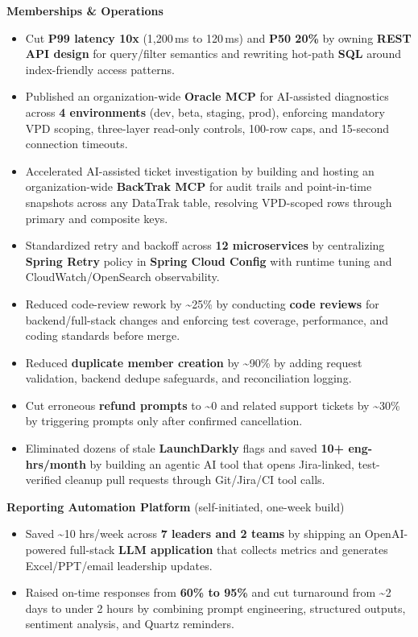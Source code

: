 \documentclass[a4paper,11pt]{article}
\newcommand{\teamFontSize}[1]{{\fontsize{10}{12}\selectfont #1}}
\newcommand{\resumeItemListStart}{\begin{justify}\begin{itemize}[leftmargin=3ex,rightmargin=2ex,labelsep=1.2mm,itemsep=2.6pt,topsep=2pt]\small}
\newcommand{\resumeItemListEnd}{\end{itemize}\end{justify}\vspace{-2mm}}
\begin{document}
\vspace{2mm}
\teamFontSize{\textbf{Memberships \& Operations}}
\vspace{-0.8mm}
\resumeItemListStart
  \item {Cut \textbf{P99 latency 10x} (1,200\,ms to 120\,ms) and \textbf{P50 20\%} by owning \textbf{REST API design} for query/f{}ilter semantics and rewriting hot-path \textbf{SQL} around index-friendly access patterns.}
  \item {Published an organization-wide \textbf{Oracle MCP} for AI-assisted diagnostics across \textbf{4 environments} (dev, beta, staging, prod), enforcing mandatory VPD scoping, three-layer read-only controls, 100-row caps, and 15-second connection timeouts.}
  \item {Accelerated AI-assisted ticket investigation by building and hosting an organization-wide \textbf{BackTrak MCP} for audit trails and point-in-time snapshots across any DataTrak table, resolving VPD-scoped rows through primary and composite keys.}
  \item {Standardized retry and backof{}f across \textbf{12 microservices} by centralizing \textbf{Spring Retry} policy in \textbf{Spring Cloud Conf{}ig} with runtime tuning and CloudWatch/OpenSearch observability.}
  \item {Reduced code-review rework by \textasciitilde{}25\% by conducting \textbf{code reviews} for backend/full-stack changes and enforcing test coverage, performance, and coding standards before merge.}
  \item {Reduced \textbf{duplicate member creation} by \textasciitilde{}90\% by adding request validation, backend dedupe safeguards, and reconciliation logging.}
  \item {Cut erroneous \textbf{refund prompts} to \textasciitilde{}0 and related support tickets by \textasciitilde{}30\% by triggering prompts only after conf{}irmed cancellation.}
  \item {Eliminated dozens of stale \textbf{LaunchDarkly} f{}lags and saved \textbf{10+ eng-hrs/month} by building an agentic AI tool that opens Jira-linked, test-verif{}ied cleanup pull requests through Git/Jira/CI tool calls.}
\resumeItemListEnd

\vspace{-1mm}
\teamFontSize{\textbf{Reporting Automation Platform} \textnormal{\footnotesize(self-initiated, one-week build)}}
\vspace{-0.8mm}
\resumeItemListStart
  \item {Saved \textasciitilde{}10 hrs/week across \textbf{7 leaders and 2 teams} by shipping an OpenAI-powered full-stack \textbf{LLM application} that collects metrics and generates Excel/PPT/email leadership updates.}
  \item {Raised on-time responses from \textbf{60\% to 95\%} and cut turnaround from \textasciitilde{}2 days to under 2 hours by combining prompt engineering, structured outputs, sentiment analysis, and Quartz reminders.}
\resumeItemListEnd
\end{document}
